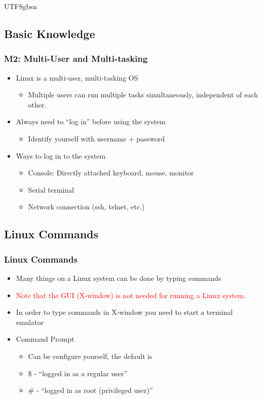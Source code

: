 \documentclass[red]{beamer}
\begin{document}
\begin{CJK*}{UTF8}{gbsn}
\subsection{Basic Knowledge}

\begin{frame}
\frametitle{M2: Multi-User and Multi-tasking}
\begin{itemize}
    \item Linux is a multi-user, multi-tasking OS
    \begin{itemize}
        \item Multiple users can run multiple tasks simultaneously, independent 
			of each other.
    \end{itemize}
    \item Always need to ``log in'' before using the system
    \begin{itemize}
        \item Identify yourself with username + password
    \end{itemize}
    \item Ways to log in to the system
    \begin{itemize}
        \item Console: Directly attached keyboard, mouse, monitor
        \item Serial terminal
        \item Network connection (ssh, telnet, etc.)
    \end{itemize}
\end{itemize}
\end{frame}

\subsection{Linux Commands}
\begin{frame}
\frametitle{Linux Commands}
\begin{itemize}
    \item Many things on a Linux system can be done by typing commands
    \item \textcolor{red}{Note that the GUI (X-window) is not needed for running a Linux system.}
    \item In order to type commands in X-window you need to start a terminal emulator
    \item Command Prompt
    \begin{itemize}
        \item Can be configure yourself, the default is
        \item \$ - ``logged in as a regular user''
        \item \# - ``logged in as root (privileged user)''
    \end{itemize}
\end{itemize}
\end{frame}


\end{CJK*}
\end{document}

